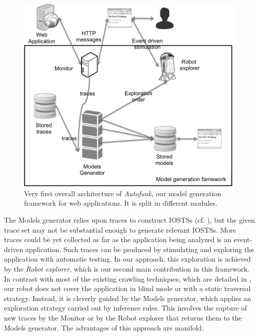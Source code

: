 \begin{figure}[ht]
    \begin{center}
        \includegraphics[width=0.8\linewidth]{figures/soict-framework.png}
    \end{center}

    \caption{Very first overall architecture of \textit{Autofunk}, our
    model generation framework for web applications. It is split
    in different modules.}
    \label{fig:soict-framework}
\end{figure}

The Models generator relies upon traces to construct IOSTSs (cf.
), but the given
trace set may not be substantial enough to generate relevant
IOSTSs. More traces could be yet collected as far as the
application being analyzed is an event-driven application.  Such
traces can be produced by stimulating and exploring the
application with automatic testing. In our approach, this
exploration is achieved by the \textit{Robot explorer}, which is
our second main contribution in this framework. In contrast with
most of the existing crawling techniques, which are detailed in
, our robot does not
cover the application in blind mode or with a static traversal
strategy.  Instead, it is cleverly guided by the Models
generator, which applies an exploration strategy carried out by
inference rules.  This involves the capture of new traces by the
Monitor or by the Robot explorer that returns them to the Models
generator. The advantages of this approach are manifold:


